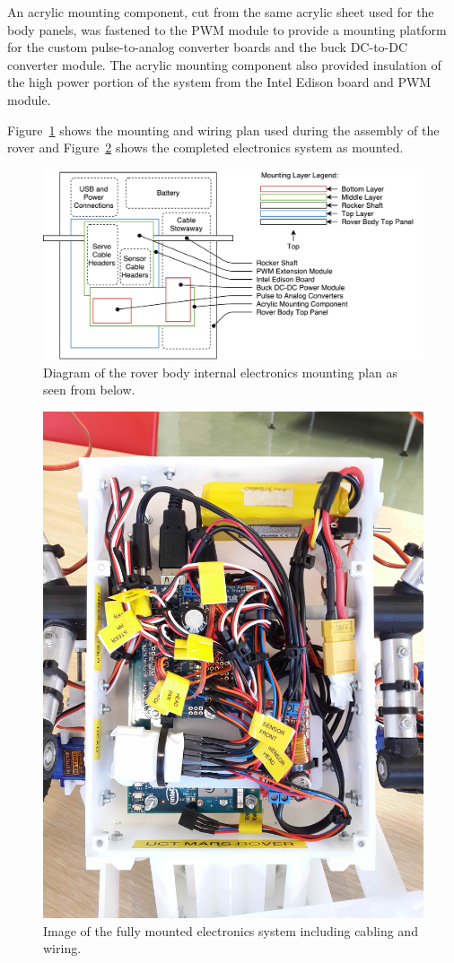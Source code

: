       An acrylic mounting component, cut from the same acrylic sheet used for the body panels, was fastened to the PWM module to provide a mounting platform for the custom pulse-to-analog converter boards and the buck DC-to-DC converter module. The acrylic mounting component also provided insulation of the high power portion of the system from the Intel Edison board and PWM module.
      
      Figure~\ref{fig:mechBuild-internalElectronicsMountingPlan} shows the mounting and wiring plan used during the assembly of the rover and Figure~\ref{fig:mechBuild-internalElectronics} shows the completed electronics system as mounted.
      
      \begin{figure}[h!]
        \centering
        \includegraphics[width=0.9\linewidth]{figures/mechBuild-internalElectronicsMountingPlan}
        \caption[Diagram of the rover body internal electronics mounting plan as seen from below.]{Diagram of the rover body internal electronics mounting plan as seen from below.}
        \label{fig:mechBuild-internalElectronicsMountingPlan}
      \end{figure}
      
      \begin{figure}[h!]
        \centering
        \includegraphics[angle=270, width=0.5\linewidth]{figures/mechBuild-internalElectronics}
        \caption[Image of the fully mounted electronics system including cabling and wiring.]{Image of the fully mounted electronics system including cabling and wiring.}
        \label{fig:mechBuild-internalElectronics}
      \end{figure}
      
